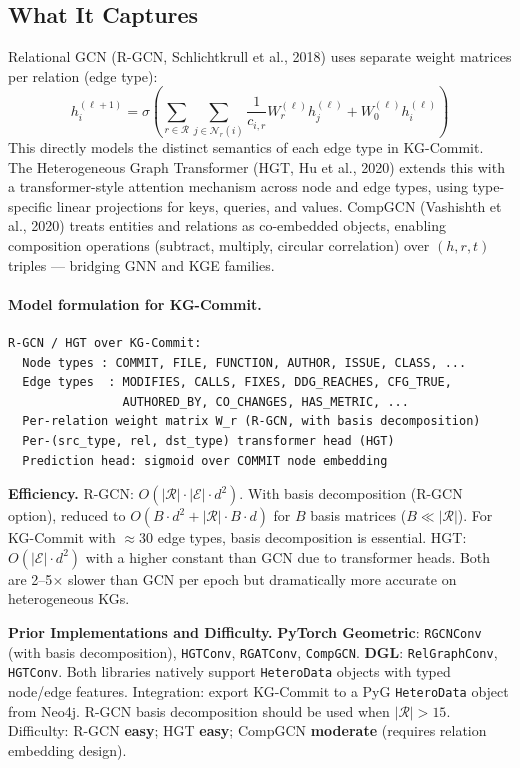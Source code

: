 \documentclass[12pt,a4paper]{article}
\begin{document}
\subsection{What It Captures}

Relational GCN (R-GCN, Schlichtkrull et al., 2018) uses separate weight matrices
per relation (edge type):
\[
  h_i^{(\ell+1)} = \sigma\!\left(\sum_{r \in \mathcal{R}} \sum_{j \in \mathcal{N}_r(i)} \frac{1}{c_{i,r}} W_r^{(\ell)} h_j^{(\ell)} + W_0^{(\ell)} h_i^{(\ell)}\right)
\]
This directly models the distinct semantics of each edge type in KG-Commit.
The Heterogeneous Graph Transformer (HGT, Hu et al., 2020) extends this with a
transformer-style attention mechanism across node and edge types, using
type-specific linear projections for keys, queries, and values. CompGCN
(Vashishth et al., 2020) treats entities and relations as co-embedded objects,
enabling composition operations (subtract, multiply, circular correlation) over
$(h, r, t)$ triples --- bridging GNN and KGE families.

\paragraph{Model formulation for KG-Commit.}
\begin{lstlisting}
R-GCN / HGT over KG-Commit:
  Node types : COMMIT, FILE, FUNCTION, AUTHOR, ISSUE, CLASS, ...
  Edge types  : MODIFIES, CALLS, FIXES, DDG_REACHES, CFG_TRUE,
                AUTHORED_BY, CO_CHANGES, HAS_METRIC, ...
  Per-relation weight matrix W_r (R-GCN, with basis decomposition)
  Per-(src_type, rel, dst_type) transformer head (HGT)
  Prediction head: sigmoid over COMMIT node embedding
\end{lstlisting}

\begin{effbox}
\textbf{Efficiency.}
R-GCN: $O(|\mathcal{R}| \cdot |\mathcal{E}| \cdot d^2)$. With basis
decomposition (R-GCN option), reduced to $O(B \cdot d^2 + |\mathcal{R}|
\cdot B \cdot d)$ for $B$ basis matrices ($B \ll |\mathcal{R}|$).
For KG-Commit with $\approx$30 edge types, basis decomposition is essential.
HGT: $O(|\mathcal{E}| \cdot d^2)$ with a higher constant than GCN due to
transformer heads. Both are 2--5$\times$ slower than GCN per epoch but
dramatically more accurate on heterogeneous KGs.
\end{effbox}

\begin{implbox}
\textbf{Prior Implementations and Difficulty.}
\textbf{PyTorch Geometric}: \texttt{RGCNConv} (with basis decomposition),
\texttt{HGTConv}, \texttt{RGATConv}, \texttt{CompGCN}.
\textbf{DGL}: \texttt{RelGraphConv}, \texttt{HGTConv}.
Both libraries natively support \texttt{HeteroData} objects with typed
node/edge features. Integration: export KG-Commit to a PyG \texttt{HeteroData}
object from Neo4j. R-GCN basis decomposition should be used when
$|\mathcal{R}| > 15$. Difficulty: R-GCN \textbf{easy}; HGT \textbf{easy};
CompGCN \textbf{moderate} (requires relation embedding design).
\end{implbox}
\end{document}
